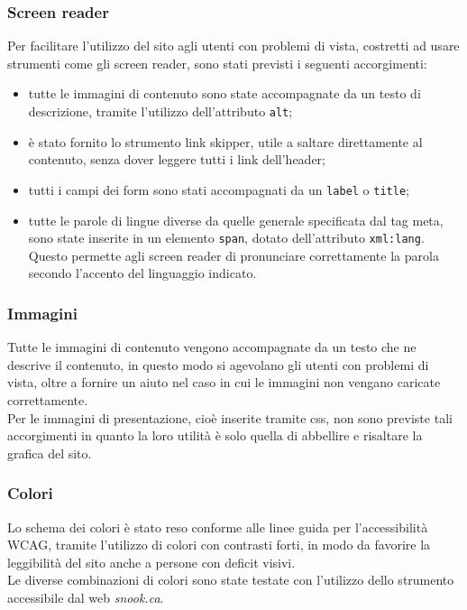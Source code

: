 		\subsubsection{Screen reader}
		Per facilitare l'utilizzo del sito agli utenti con problemi di vista, costretti ad usare strumenti come gli screen reader, sono stati previsti i seguenti accorgimenti:
		\begin{itemize}
			\item tutte le immagini di contenuto sono state accompagnate da un testo di descrizione, tramite l'utilizzo dell'attributo \texttt{alt};
			\item è stato fornito lo strumento link skipper, utile a saltare direttamente al contenuto, senza dover leggere tutti i link dell'header;
			\item tutti i campi dei form sono stati accompagnati da un \texttt{label} o \texttt{title};
			\item tutte le parole di lingue diverse da quelle generale specificata dal tag meta, sono state inserite in un elemento \texttt{span}, dotato dell'attributo \texttt{xml:lang}. Questo permette agli screen reader di pronunciare correttamente la parola secondo l'accento del linguaggio indicato.
		\end{itemize}
		\subsubsection{Immagini}
		Tutte le immagini di contenuto vengono accompagnate da un testo che ne descrive il contenuto, in questo modo si agevolano gli utenti con problemi di vista, oltre a fornire un aiuto nel caso in cui le immagini non vengano caricate correttamente. \\
		Per le immagini di presentazione, cioè inserite tramite css, non sono previste tali accorgimenti in quanto la loro utilità è solo quella di abbellire e risaltare la grafica del sito.
		\subsubsection{Colori}
		Lo schema dei colori è stato reso conforme alle linee guida per l'accessibilità WCAG, tramite l'utilizzo di colori con contrasti forti, in modo da favorire la leggibilità del sito anche a persone con deficit visivi. \\
		Le diverse combinazioni di colori sono state testate con l'utilizzo dello strumento accessibile dal web \textit{snook.ca}.
